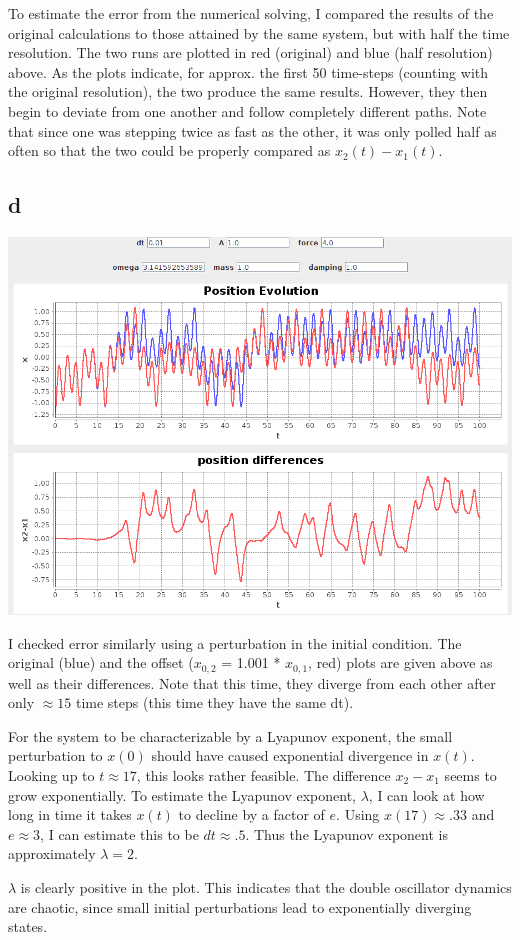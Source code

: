 \documentclass[aps,letterpaper,10pt]{article}
\begin{document}
To estimate the error from the numerical solving, I compared the results of the original calculations to those attained by the same system, but with half the time resolution. The two runs are plotted in red (original) and blue (half resolution) above. As the plots indicate, for approx. the first 50 time-steps (counting with the original resolution), the two produce the same results. However, they then begin to deviate from one another and follow completely different paths. Note that since one was stepping twice as fast as the other, it was only polled half as often so that the two could be properly compared as $x_2(t) - x_1(t)$.

\newpage
\subsection*{d}
\begin{center}
\includegraphics[width=.6\textwidth]{../img/dw2-2.png}
\end{center}

I checked error similarly using a perturbation in the initial condition. The original (blue) and the offset ($x_{0,2}$ = 1.001 * $x_{0,1}$, red) plots are given above as well as their differences. Note that this time, they diverge from each other after only $\approx15$ time steps (this time they have the same dt).

For the system to be characterizable by a Lyapunov exponent, the small perturbation to $x(0)$ should have caused exponential divergence in $x(t)$. Looking up to $t\approx 17$, this looks rather feasible. The difference $x_2 - x_1$ seems to grow exponentially. To estimate the Lyapunov exponent, $\lambda$, I can look at how long in time it takes $x(t)$ to decline by a factor of $e$. Using $x(17)\approx .33$ and $e\approx 3$, I can estimate this to be $dt \approx .5$. Thus the Lyapunov exponent is approximately $\lambda = 2$.

$\lambda$ is clearly positive in the plot. This indicates that the double oscillator dynamics are chaotic, since small initial perturbations lead to exponentially diverging states.
\end{document}
